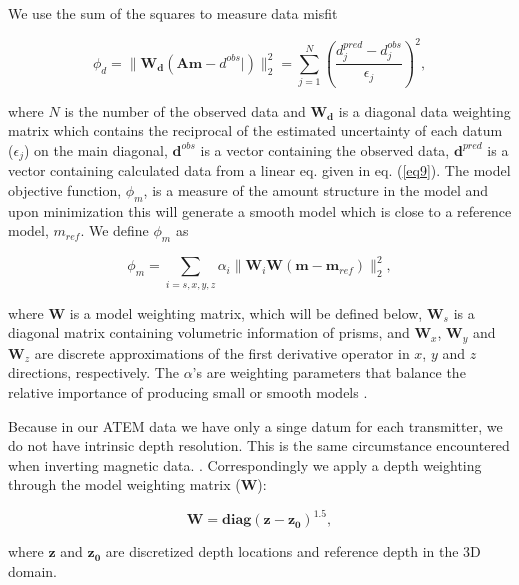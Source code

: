 \documentclass[extra,mreferee]{gji}
\begin{document}
We use the sum of the squares to measure data misfit
\begin{linenomath*}
\begin{equation}
  \phi_d = \| \mathbf{W_d}(\mathbf{A}\mathbf{m}-d^{obs}|)\|^2_2 =
  \sum^N_{j=1}(\frac{d^{pred}_j-d^{obs}_j}{\epsilon_j})^2,
  \label{eq11}
\end{equation}
\end{linenomath*}
where $N$ is the number of the observed data and $\mathbf{W_d}$ is a diagonal data weighting matrix which contains the reciprocal of the estimated uncertainty of each datum ($\epsilon_j$) on the main diagonal,  $\mathbf{d}^{obs}$ is a vector containing the observed data, $\mathbf{d}^{pred}$ is a vector containing calculated data from a linear eq. given in eq. (\ref{eq9}).
The model objective function, $\phi_m$, is a measure of the amount structure in the model and upon minimization this will generate a smooth model which is close to a reference model, $m_{ref}$.
We define $\phi_m$ as
\begin{linenomath*}
\begin{equation}
  \phi_m = \sum_{i=s,x,y,z} \alpha_i\| \mathbf{W}_i\mathbf{W}(\mathbf{m}-\mathbf{m}_{ref})\|^2_2,
  \label{eq12}
\end{equation}
\end{linenomath*}
where $\mathbf{W}$ is a model weighting matrix, which will be defined below, $\mathbf{W}_s$ is a diagonal matrix containing volumetric information of prisms, and $\mathbf{W}_x$, $\mathbf{W}_y$ and $\mathbf{W}_z$ are discrete approximations of the first derivative operator in $x$, $y$ and $z$ directions, respectively.
The $\alpha$'s are weighting parameters that balance the relative importance of producing small or smooth models \cite[]{TikhonovA.N.1977}.

Because in our ATEM data we have only a singe datum for each transmitter, we do not have intrinsic depth resolution.
This is the same circumstance encountered when inverting magnetic data. \cite[]{LiMag3D}. Correspondingly we apply a depth weighting through the model weighting matrix ($\mathbf{W}$):
\begin{linenomath*}
\begin{equation}
    \mathbf{W} = \mathbf{diag}(\mathbf{z-z_0})^{1.5},
    \label{eq: weight_mat}
\end{equation}
\end{linenomath*}
where $\mathbf{z}$ and $\mathbf{z_0}$ are discretized depth locations and reference depth in the 3D domain.
\end{document}
